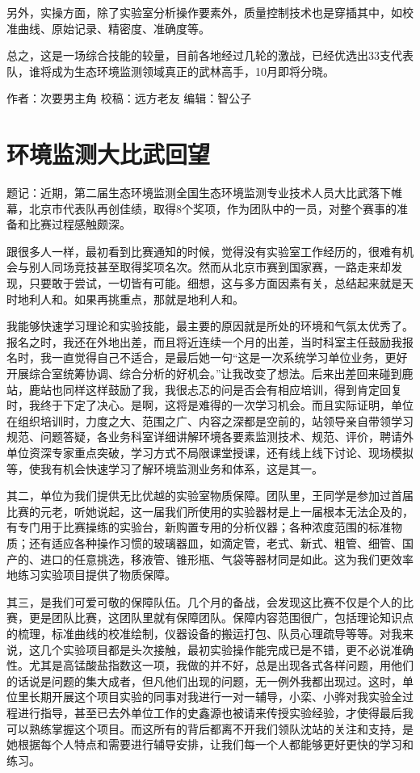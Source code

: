 \documentclass[
]{book}
\begin{document}
另外，实操方面，除了实验室分析操作要素外，质量控制技术也是穿插其中，如校准曲线、原始记录、精密度、准确度等。

总之，这是一场综合技能的较量，目前各地经过几轮的激战，已经优选出33支代表队，谁将成为生态环境监测领域真正的武林高手，10月即将分晓。

作者：次要男主角
校稿：远方老友
编辑：智公子

\hypertarget{ux73afux5883ux76d1ux6d4bux5927ux6bd4ux6b66ux56deux671b}{%
\section{环境监测大比武回望}\label{ux73afux5883ux76d1ux6d4bux5927ux6bd4ux6b66ux56deux671b}}

题记：近期，第二届生态环境监测全国生态环境监测专业技术人员大比武落下帷幕，北京市代表队再创佳绩，取得8个奖项，作为团队中的一员，对整个赛事的准备和比赛过程感触颇深。

跟很多人一样，最初看到比赛通知的时候，觉得没有实验室工作经历的，很难有机会与别人同场竞技甚至取得奖项名次。然而从北京市赛到国家赛，一路走来却发现，只要敢于尝试，一切皆有可能。细想，这与多方面因素有关，总结起来就是天时地利人和。如果再挑重点，那就是地利人和。

我能够快速学习理论和实验技能，最主要的原因就是所处的环境和气氛太优秀了。报名之时，我还在外地出差，而且将近连续一个月的出差，当时科室主任鼓励我报名时，我一直觉得自己不适合，是最后她一句``这是一次系统学习单位业务，更好开展综合室统筹协调、综合分析的好机会。''让我改变了想法。后来出差回来碰到鹿站，鹿站也同样这样鼓励了我，我很忐忑的问是否会有相应培训，得到肯定回复时，我终于下定了决心。是啊，这将是难得的一次学习机会。而且实际证明，单位在组织培训时，力度之大、范围之广、内容之深都是空前的，站领导亲自带领学习规范、问题答疑，各业务科室详细讲解环境各要素监测技术、规范、评价，聘请外单位资深专家重点突破，学习方式不局限课堂授课，还有线上线下讨论、现场模拟等，使我有机会快速学习了解环境监测业务和体系，这是其一。

其二，单位为我们提供无比优越的实验室物质保障。团队里，王同学是参加过首届比赛的元老，听她说起，这一届我们所使用的实验器材是上一届根本无法企及的，有专门用于比赛操练的实验台，新购置专用的分析仪器；各种浓度范围的标准物质；还有适应各种操作习惯的玻璃器皿，如滴定管，老式、新式、粗管、细管、国产的、进口的任意挑选，移液管、锥形瓶、气袋等器材同是如此。这为我们更效率地练习实验项目提供了物质保障。

其三，是我们可爱可敬的保障队伍。几个月的备战，会发现这比赛不仅是个人的比赛，更是团队比赛，这团队里就有保障团队。保障内容范围很广，包括理论知识点的梳理，标准曲线的校准绘制，仪器设备的搬运打包、队员心理疏导等等。对我来说，这几个实验项目都是头次接触，最初实验操作能完成已是不错，更不必说准确性。尤其是高锰酸盐指数这一项，我做的并不好，总是出现各式各样问题，用他们的话说是问题的集大成者，但凡他们出现的问题，无一例外我都出现过。这时，单位里长期开展这个项目实验的同事对我进行一对一辅导，小栾、小骅对我实验全过程进行指导，甚至已去外单位工作的史鑫源也被请来传授实验经验，才使得最后我可以熟练掌握这个项目。而这所有的背后都离不开我们领队沈站的关注和支持，是她根据每个人特点和需要进行辅导安排，让我们每一个人都能够更好更快的学习和练习。
\end{document}
